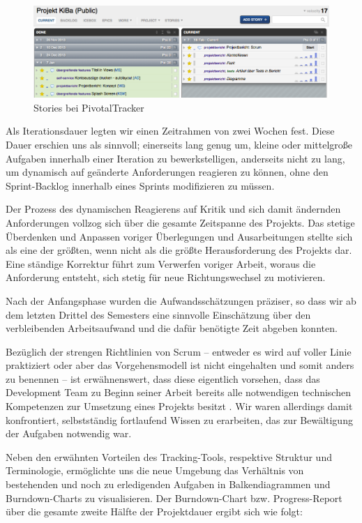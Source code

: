 \begin{figure}[h]
	\centering
	\includegraphics[scale=.25]{Pictures/pivottracker-overview}
	\caption{Stories bei PivotalTracker\label{fig:Pivottracker}}
\end{figure}

	Als Iterationsdauer legten wir einen Zeitrahmen von zwei Wochen fest. Diese Dauer erschien uns als sinnvoll; einerseits lang genug um, kleine oder mittelgroße Aufgaben innerhalb einer Iteration zu bewerkstelligen, anderseits nicht zu lang, um dynamisch auf geänderte Anforderungen reagieren zu können, ohne den Sprint-Backlog innerhalb eines Sprints modifizieren zu müssen. 
	
	Der Prozess des dynamischen Reagierens auf Kritik und sich damit ändernden Anforderungen vollzog sich über die gesamte Zeitspanne des Projekts. Das stetige Überdenken und Anpassen voriger Überlegungen und Ausarbeitungen stellte sich als eine der größten, wenn nicht als die größte Herausforderung des Projekts dar. Eine ständige Korrektur führt zum Verwerfen voriger Arbeit, woraus die Anforderung entsteht, sich stetig für neue Richtungswechsel zu motivieren.  

	Nach der Anfangsphase wurden die Aufwandsschätzungen präziser, so dass wir ab dem letzten Drittel des Semesters eine sinnvolle Einschätzung über den verbleibenden Arbeitsaufwand und die dafür benötigte Zeit abgeben konnten. 

	Bezüglich der strengen Richtlinien von Scrum – entweder es wird auf voller Linie praktiziert oder aber das Vorgehensmodell ist nicht eingehalten und somit anders zu benennen – ist erwähnenswert, dass diese eigentlich vorsehen, dass das Development Team zu Beginn seiner Arbeit bereits alle notwendigen technischen Kompetenzen zur Umsetzung eines Projekts besitzt \citep{ScrumGuideFull12}. Wir waren allerdings damit konfrontiert, selbstständig fortlaufend Wissen zu erarbeiten, das zur Bewältigung der Aufgaben notwendig war.

	 Neben den erwähnten Vorteilen des Tracking-Tools, respektive Struktur und Terminologie, ermöglichte uns die neue Umgebung das Verhältnis von bestehenden und noch zu erledigenden Aufgaben in Balkendiagrammen und Burndown-Charts zu visualisieren. Der Burndown-Chart bzw. Progress-Report über die gesamte zweite Hälfte der Projektdauer ergibt sich wie folgt:
	 
